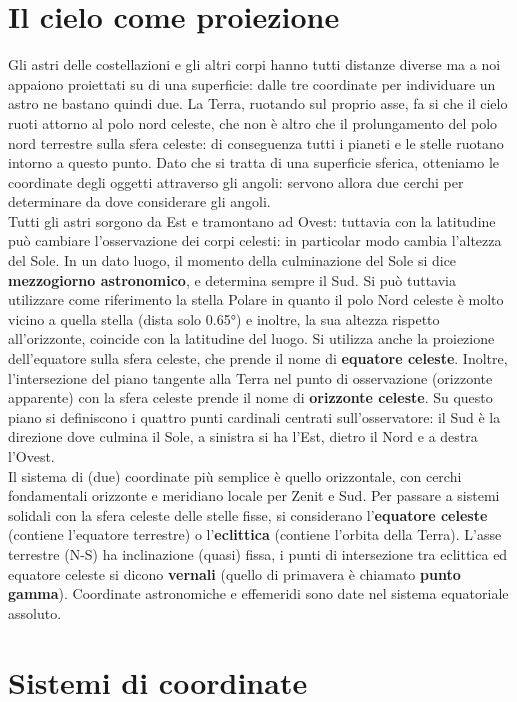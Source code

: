 \documentclass[a4paper, oneside]{book}
\begin{document}
\section{Il cielo come proiezione}
Gli astri delle costellazioni e gli altri corpi hanno tutti distanze diverse ma
a noi appaiono proiettati su di una superficie: dalle tre coordinate per individuare un astro ne bastano
quindi due. La Terra, ruotando sul proprio asse, fa si che il cielo ruoti attorno al polo nord 
celeste, che non è altro che il prolungamento del polo nord terrestre sulla sfera celeste:
di conseguenza tutti i pianeti e le stelle ruotano intorno a questo punto.  
Dato che si tratta di una superficie sferica, otteniamo le coordinate degli oggetti
attraverso gli angoli: servono allora due cerchi per determinare da dove considerare gli
angoli.\\
Tutti gli astri sorgono da Est e tramontano ad Ovest: tuttavia con la latitudine può cambiare
l'osservazione dei corpi celesti: in particolar modo cambia l'altezza del Sole. In un dato luogo, 
il momento della culminazione del Sole si dice \textbf{mezzogiorno astronomico}, e determina sempre il Sud.
Si può tuttavia utilizzare come riferimento
la stella Polare in quanto il polo Nord celeste è molto vicino a quella stella 
(dista solo 0.65°) e inoltre, la sua altezza rispetto all'orizzonte, coincide con la 
latitudine del luogo. Si utilizza anche
la proiezione dell'equatore sulla sfera celeste, che prende il nome di \textbf{equatore celeste}.
Inoltre, l'intersezione del piano tangente alla Terra nel punto di osservazione (orizzonte apparente) 
con la sfera celeste prende il nome di \textbf{orizzonte celeste}. Su questo piano si definiscono i quattro punti cardinali
centrati sull'osservatore: il Sud è la direzione dove culmina il Sole, a sinistra si ha l'Est, dietro il Nord 
e a destra l'Ovest. \\
Il sistema di (due) coordinate più
semplice è quello orizzontale, con
cerchi fondamentali orizzonte e
meridiano locale per Zenit e Sud.
Per passare a sistemi solidali con
la sfera celeste delle stelle fisse, si
considerano l'\textbf{equatore celeste}
(contiene l’equatore terrestre) o
l'\textbf{eclittica} (contiene l’orbita della
Terra). L’asse terrestre (N-S) ha
inclinazione (quasi) fissa, i punti di
intersezione tra eclittica ed
equatore celeste si dicono \textbf{vernali}
(quello di primavera è chiamato \textbf{punto gamma}). Coordinate astronomiche
e effemeridi sono date nel sistema
equatoriale assoluto.

\clearpage
\section{Sistemi di coordinate}
\end{document}
